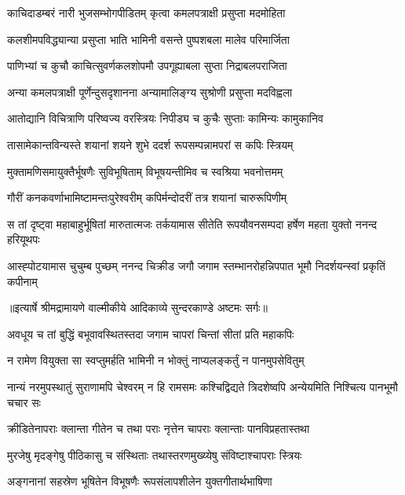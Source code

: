 \twolineshloka
{काचिदाडम्बरं नारी भुजसम्भोगपीडितम्}
{कृत्वा कमलपत्राक्षी प्रसुप्ता मदमोहिता} %

\twolineshloka
{कलशीमपविद्ध्यान्या प्रसुप्ता भाति भामिनी}
{वसन्ते पुष्पशबला मालेव परिमार्जिता} %

\twolineshloka
{पाणिभ्यां च कुचौ काचित्सुवर्णकलशोपमौ}
{उपगूह्याबला सुप्ता निद्राबलपराजिता} %

\twolineshloka
{अन्या कमलपत्राक्षी पूर्णेन्दुसदृशानना}
{अन्यामालिङ्ग्य सुश्रोणी प्रसुप्ता मदविह्वला} %

\twolineshloka
{आतोद्यानि विचित्राणि परिष्वज्य वरस्त्रियः}
{निपीड्य च कुचैः सुप्ताः कामिन्यः कामुकानिव} %

\twolineshloka
{तासामेकान्तविन्यस्ते शयानां शयने शुभे}
{ददर्श रूपसम्पन्नामपरां स कपिः स्त्रियम्} %

\twolineshloka
{मुक्तामणिसमायुक्तैर्भूषणैः सुविभूषिताम्}
{विभूषयन्तीमिव च स्वश्रिया भवनोत्तमम्} %

\twolineshloka
{गौरीं कनकवर्णाभामिष्टामन्तःपुरेश्वरीम्}
{कपिर्मन्दोदरीं तत्र शयानां चारुरूपिणीम्} %

\threelineshloka
{स तां दृष्ट्वा महाबाहुर्भूषितां मारुतात्मजः}
{तर्कयामास सीतेति रूपयौवनसम्पदा}
{हर्षेण महता युक्तो ननन्द हरियूथपः} %

\fourlineindentedshloka
{आस्ह्पोटयामास चुचुम्ब पुच्छम्}
{ननन्द चिक्रीड जगौ जगाम}
{स्तम्भानरोहन्निपपात भूमौ}
{निदर्शयन्स्वां प्रकृतिं कपीनाम्} %


{॥इत्यार्षे श्रीमद्रामायणे वाल्मीकीये आदिकाव्ये सुन्दरकाण्डे अष्टमः सर्गः॥}


\twolineshloka
{अवधूय च तां बुद्धिं बभूवावस्थितस्तदा}
{जगाम चापरां चिन्तां सीतां प्रति महाकपिः} %

\twolineshloka
{न रामेण वियुक्ता सा स्वप्तुमर्हति भामिनी}
{न भोक्तुं नाप्यलङ्कर्तुं न पानमुपसेवितुम्} %

\threelineshloka
{नान्यं नरमुपस्थातुं सुराणामपि चेश्वरम्}
{न हि रामसमः कश्चिद्विद्यते त्रिदशेष्वपि}
{अन्येयमिति निश्चित्य पानभूमौ चचार सः} %

\twolineshloka
{क्रीडितेनापराः क्लान्ता गीतेन च तथा पराः}
{नृत्तेन चापराः क्लान्ताः पानविप्रहतास्तथा} %

\twolineshloka
{मुरजेषु मृदङ्गेषु पीठिकासु च संस्थिताः}
{तथास्तरणमुख्य्येषु संविष्टाश्चापराः स्त्रियः} %

\twolineshloka
{अङ्गनानां सहस्रेण भूषितेन विभूषणैः}
{रूपसंलापशीलेन युक्तगीतार्थभाषिणा} %

